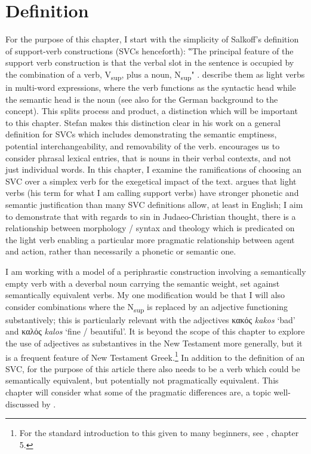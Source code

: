\documentclass[output=paper,colorlinks,citecolor=brown]{langscibook}
\begin{document}
\section{Definition}\label{definitionCR}
\largerpage
For the purpose of this chapter, I start with the simplicity of
Salkoff's definition of support-verb constructions (SVCs henceforth):
‟The principal feature of the support verb construction is that the
verbal slot in the sentence is occupied by the combination of a verb,
V\textsubscript{sup}, plus a noun, N\textsubscript{sup}" \citep[244]{salkoff_automatic_1990}. 
\citet[329]{nagy_t_full-coverage_2013} describe them as light verbs in multi-word
expressions, where the verb functions as the syntactic head while the
semantic head is the noun (see also \citealt{kamber_funktionsverbgefuge_2008} for the German background to the concept).
This splits process and product, a distinction which will be important
to this chapter. Stefan \citet{langer_formal_2005} makes this distinction clear in his work
on a general definition for SVCs which includes demonstrating the
semantic emptiness, potential interchangeability, and removability of
the verb.
\citet[275]{gross_lexicon-grammar_1984} encourages us to consider
phrasal lexical entries, that is nouns in their verbal contexts, and not
just individual words.
In this chapter, I examine the ramifications of
choosing an SVC over a simplex verb for the exegetical impact of the
text. 
\citet[363]{stroik_light_2001} argues that light verbs (his term for what I am calling support verbs) have
stronger phonetic and semantic justification than many SVC definitions
allow, at least in English; I aim to demonstrate that
with regards to sin in Judaeo-Christian thought, there is a relationship
between morphology / syntax and theology which is predicated on the
light verb enabling a particular more pragmatic relationship between
agent and action, rather than necessarily a phonetic or semantic
one.

I am working with a model of a periphrastic construction involving a
semantically empty verb with a deverbal noun carrying the semantic
weight, set against semantically equivalent verbs. 
My one modification would be that
I will also consider combinations where the N\textsubscript{sup} is
replaced by an adjective functioning substantively; this is particularly
relevant with the adjectives κακός \textit{kakos} ‘bad' and καλός \textit{kalos} ‘fine /
beautiful'. 
It is beyond the scope of this chapter to explore the use
of adjectives as substantives in the New Testament more generally, but
it is a frequent feature of New Testament Greek.\footnote{For the
  standard introduction to this given to many beginners, see \citet{duff_elements_2008}, chapter 5.}
In addition to the definition of an SVC, for
the purpose of this article there also needs to be a verb which could be
semantically equivalent, but potentially not pragmatically equivalent.
This chapter will consider what some of the pragmatic differences are, a
topic well-discussed by \citet[74]{cappelle_taking_2022}.
\end{document}
